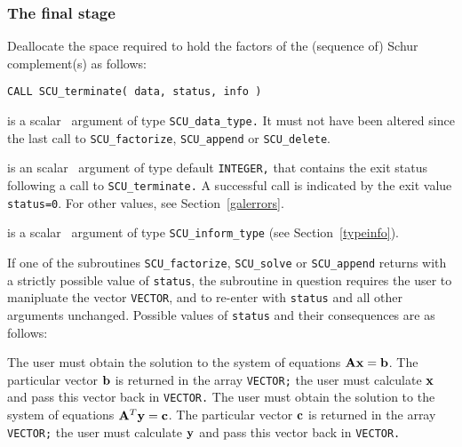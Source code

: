 \documentclass{galahad}
\newcommand{\packagename}{SCU}
\begin{document}

\subsubsection{The final stage}
Deallocate the space required to hold the factors of the 
(sequence of) Schur complement(s) as follows:
\vspace*{1mm}

\hskip0.5in 
{\tt CALL \packagename\_terminate( data, status, info )}

\vspace*{-2mm}
\begin{description}
 is a scalar \intentinout\ argument of type 
{\tt \packagename\_data\_type.} 
It must not have been altered since the last call to  
{\tt \packagename\_factorize}, 
{\tt \packagename\_append} or {\tt \packagename\_delete}. 
 
 is an scalar \intentout\ argument of type default 
{\tt INTEGER,} that  
contains the exit status following a call to {\tt \packagename\_terminate.} 
A successful call is indicated by the exit value {\tt status=0}. 
For other values, see Section~\ref{galerrors}. 
 
 is a scalar \intentout\ argument of type 
{\tt \packagename\_inform\_type} 
(see Section~\ref{typeinfo}). 
 

\end{description}


\galreverse
If one of the subroutines 
{\tt \packagename\_factorize},  
{\tt \packagename\_solve} or  
{\tt \packagename\_append} 
returns with a strictly possible value of {\tt status},  
the subroutine in question requires the user to manipluate the vector  
{\tt VECTOR}, and to re-enter with {\tt status} and all other arguments 
unchanged. 
Possible values of {\tt status} and their consequences are as follows: 

\begin{description} 
 The user must obtain the solution to the system of equations 
$ {\mathbf{A}} {\mathbf{x}}  =  {\mathbf{b}}$. 
The particular vector ${\mathbf{b}}$ is returned in the array {\tt VECTOR;} 
the user must calculate ${\mathbf{x}}$ and pass this vector back in {\tt VECTOR.} 
 The user must obtain the solution to the system of equations 
$ {\mathbf{A}}^T {\mathbf{y}}  =  {\mathbf{c}}$. 
The particular vector ${\mathbf{c}}$ is returned in the array {\tt VECTOR;} 
the user must calculate ${\mathbf{y}}$ and pass this vector back in {\tt VECTOR.} 
\end{description} 
\end{document}
